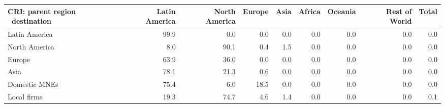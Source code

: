 \begin{tabular}{lrrrrrrrr}
\toprule
CRI: parent region \ destination & Latin America & North America & Europe & Asia & Africa & Oceania & Rest of World & Total \\
\midrule
Latin America & 99.9 & 0.0 & 0.0 & 0.0 & 0.0 & 0.0 & 0.0 & 0.0 \\
North America & 8.0 & 90.1 & 0.4 & 1.5 & 0.0 & 0.0 & 0.0 & 0.0 \\
Europe & 63.9 & 36.0 & 0.0 & 0.0 & 0.0 & 0.0 & 0.0 & 0.0 \\
Asia & 78.1 & 21.3 & 0.6 & 0.0 & 0.0 & 0.0 & 0.0 & 0.0 \\
Domestic MNEs & 75.4 & 6.0 & 18.5 & 0.0 & 0.0 & 0.0 & 0.0 & 0.0 \\
Local firms & 19.3 & 74.7 & 4.6 & 1.4 & 0.0 & 0.0 & 0.0 & 0.1 \\
\bottomrule
\end{tabular}
